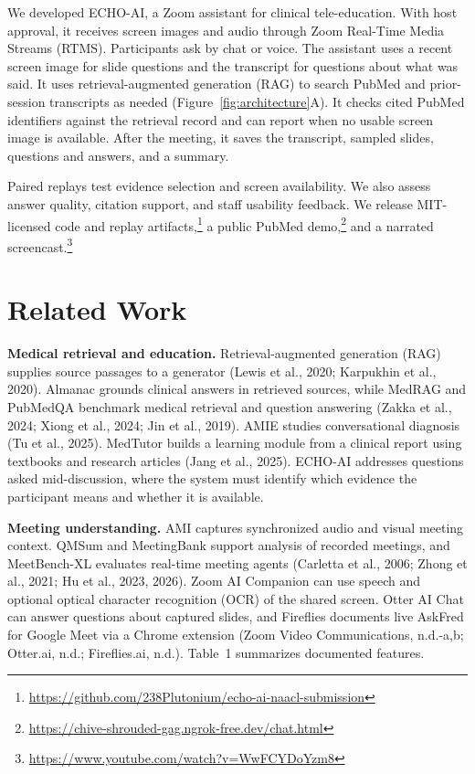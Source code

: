 \documentclass[11pt]{article}
\begin{document}
We developed ECHO-AI, a Zoom assistant for clinical tele-education. With host approval, it receives screen images and audio through Zoom Real-Time Media Streams (RTMS). Participants ask by chat or voice. The assistant uses a recent screen image for slide questions and the transcript for questions about what was said. It uses retrieval-augmented generation (RAG) to search PubMed and prior-session transcripts as needed (Figure~\ref{fig:architecture}A). It checks cited PubMed identifiers against the retrieval record and can report when no usable screen image is available. After the meeting, it saves the transcript, sampled slides, questions and answers, and a summary.

Paired replays test evidence selection and screen availability. We also assess answer quality, citation support, and staff usability feedback. We release MIT-licensed code and replay artifacts,\footnote{\url{https://github.com/238Plutonium/echo-ai-naacl-submission}} a public PubMed demo,\footnote{\url{https://chive-shrouded-gag.ngrok-free.dev/chat.html}} and a narrated screencast.\footnote{\url{https://www.youtube.com/watch?v=WwFCYDoYzm8}}

\section{Related Work}

\textbf{Medical retrieval and education.} Retrieval-augmented generation (RAG) supplies source passages to a generator (Lewis et al., 2020; Karpukhin et al., 2020). Almanac grounds clinical answers in retrieved sources, while MedRAG and PubMedQA benchmark medical retrieval and question answering (Zakka et al., 2024; Xiong et al., 2024; Jin et al., 2019). AMIE studies conversational diagnosis (Tu et al., 2025). MedTutor builds a learning module from a clinical report using textbooks and research articles (Jang et al., 2025). ECHO-AI addresses questions asked mid-discussion, where the system must identify which evidence the participant means and whether it is available.

\textbf{Meeting understanding.} AMI captures synchronized audio and visual meeting context. QMSum and MeetingBank support analysis of recorded meetings, and MeetBench-XL evaluates real-time meeting agents (Carletta et al., 2006; Zhong et al., 2021; Hu et al., 2023, 2026). Zoom AI Companion can use speech and optional optical character recognition (OCR) of the shared screen. Otter AI Chat can answer questions about captured slides, and Fireflies documents live AskFred for Google Meet via a Chrome extension (Zoom Video Communications, n.d.-a,b; Otter.ai, n.d.; Fireflies.ai, n.d.). Table~1 summarizes documented features.
\end{document}
